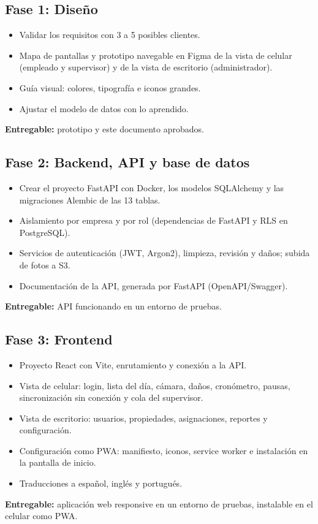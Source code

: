 \documentclass[11pt,a4paper]{article}
\begin{document}
\subsection{Fase 1: Diseño}
\begin{itemize}[leftmargin=1.2em]
  \item Validar los requisitos con 3 a 5 posibles clientes.
  \item Mapa de pantallas y prototipo navegable en Figma de la vista de celular (empleado y supervisor) y de la vista de escritorio (administrador).
  \item Guía visual: colores, tipografía e iconos grandes.
  \item Ajustar el modelo de datos con lo aprendido.
\end{itemize}
\textbf{Entregable:} prototipo y este documento aprobados.

\subsection{Fase 2: Backend, API y base de datos}
\begin{itemize}[leftmargin=1.2em]
  \item Crear el proyecto FastAPI con Docker, los modelos SQLAlchemy y las migraciones Alembic de las 13 tablas.
  \item Aislamiento por empresa y por rol (dependencias de FastAPI y RLS en PostgreSQL).
  \item Servicios de autenticación (JWT, Argon2), limpieza, revisión y daños; subida de fotos a S3.
  \item Documentación de la API, generada por FastAPI (OpenAPI/Swagger).
\end{itemize}
\textbf{Entregable:} API funcionando en un entorno de pruebas.

\subsection{Fase 3: Frontend}
\begin{itemize}[leftmargin=1.2em]
  \item Proyecto React con Vite, enrutamiento y conexión a la API.
  \item Vista de celular: login, lista del día, cámara, daños, cronómetro, pausas, sincronización sin conexión y cola del supervisor.
  \item Vista de escritorio: usuarios, propiedades, asignaciones, reportes y configuración.
  \item Configuración como PWA: manifiesto, iconos, service worker e instalación en la pantalla de inicio.
  \item Traducciones a español, inglés y portugués.
\end{itemize}
\textbf{Entregable:} aplicación web responsive en un entorno de pruebas, instalable en el celular como PWA.
\end{document}
